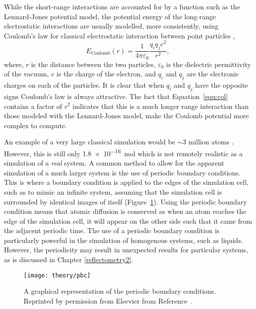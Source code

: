 While the short-range interactions are accounted for by a function such as the Lennard-Jones potential model, the potential energy of the long-range electrostatic interactions are usually modelled, more consistently, using Coulomb's law for classical electrostatic interaction between point particles \cite{coulomb_premier_1788, coulomb_second_1788},
%
\begin{equation}
  E_{\text{Coulomb}}(r) = \frac{1}{4\pi\varepsilon_0}{\frac{q_iq_je^2}{r^2}},
  \label{equ:col}
\end{equation}
%
where, $r$ is the distance between the two particles, $\varepsilon_0$ is the dielectric permittivity of the vacuum, $e$ is the charge of the electron, and $q_i$ and $q_j$ are the electronic charges on each of the particles.
It is clear that when $q_i$ and $q_j$ have the opposite signs Coulomb's law is always attractive.
The fact that Equation~\ref{equ:col} contains a factor of $r^2$ indicates that this is a much longer range interaction than those modeled with the Lennard-Jones model, make the Coulomb potential more complex to compute.

An example of a very large classical simulation would be $\sim3$ million atoms \cite{gumbart_regulation_2009}.
However, this is still only \SI{1.8e-16}{\mol} which is not remotely realistic as a simulation of a \emph{real} system.
A common method to allow for the apparent simulation of a much larger system is the use of periodic boundary conditions.
This is where a boundary condition is applied to the edges of the simulation cell, such as to mimic an infinite system, assuming that the simulation cell is surrounded by identical images of itself (Figure~\ref{fig:pbc}).
Using the periodic boundary condition means that atomic diffusion is conserved as when an atom reaches the edge of the simulation cell, it will appear on the other side such that it came from the adjacent periodic time.
The use of a periodic boundary condition is particularly powerful in the simulation of homogenous systems, such as liquids.
However, the periodicity may result in unexpected results for particular systems, as is discussed in Chapter \ref{reflectometry2}.
%
\begin{figure}
    \centering
    \texttt{[image: theory/pbc]}
    \caption{A graphical representation of the periodic boundary conditions. Reprinted by permission from Elsevier\textsuperscript{\textcopyright} from Reference~\cite{frenkel_understanding_1996}.}
    \label{fig:pbc}
\end{figure}
%

